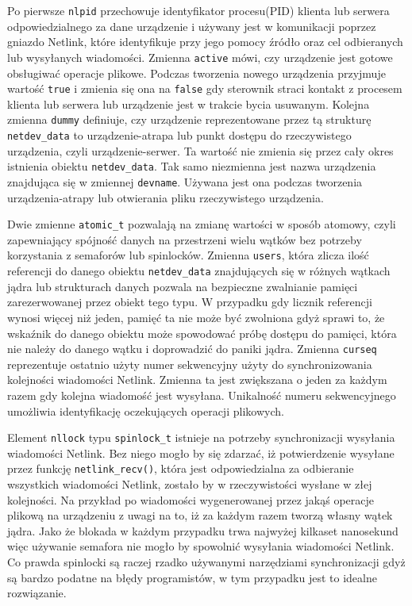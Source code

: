 \documentclass[11pt]{scrartcl}
\begin{document}
Po pierwsze \texttt{nlpid} przechowuje identyfikator procesu(PID) klienta lub serwera odpowiedzialnego za dane urządzenie i używany jest w komunikacji poprzez gniazdo Netlink, które identyfikuje przy jego pomocy źródło oraz cel odbieranych lub wysyłanych wiadomości. Zmienna \texttt{active} mówi, czy urządzenie jest gotowe obsługiwać operacje plikowe. Podczas tworzenia nowego urządzenia przyjmuje wartość \texttt{true} i zmienia się ona na \texttt{false} gdy sterownik straci kontakt z procesem klienta lub serwera lub urządzenie jest w trakcie bycia usuwanym.  Kolejna zmienna \texttt{dummy} definiuje, czy urządzenie reprezentowane przez tą strukturę \texttt{netdev\_data} to urządzenie-atrapa lub punkt dostępu do rzeczywistego urządzenia, czyli urządzenie-serwer. Ta wartość nie zmienia się przez cały okres istnienia obiektu \texttt{netdev\_data}. Tak samo niezmienna jest nazwa urządzenia znajdująca się w zmiennej \texttt{devname}. Używana jest ona podczas tworzenia urządzenia-atrapy lub otwierania pliku rzeczywistego urządzenia.

Dwie zmienne \texttt{atomic\_t} pozwalają na zmianę wartości w sposób atomowy, czyli zapewniający spójność danych na przestrzeni wielu wątków bez potrzeby korzystania z semaforów lub spinlocków. Zmienna \texttt{users}, która zlicza ilość referencji do danego obiektu \texttt{netdev\_data} znajdujących się w różnych wątkach jądra lub strukturach danych pozwala na bezpieczne zwalnianie pamięci zarezerwowanej przez obiekt tego typu. W przypadku gdy licznik referencji wynosi więcej niż jeden, pamięć ta nie może być zwolniona gdyż sprawi to, że wskaźnik do danego obiektu może spowodować próbę dostępu do pamięci, która nie należy do danego wątku i doprowadzić do paniki jądra. Zmienna \texttt{curseq} reprezentuje ostatnio użyty numer sekwencyjny użyty do synchronizowania kolejności wiadomości Netlink. Zmienna ta jest zwiększana o jeden za każdym razem gdy kolejna wiadomość jest wysyłana. Unikalność numeru sekwencyjnego umożliwia identyfikację oczekujących operacji plikowych.

Element \texttt{nllock} typu \texttt{spinlock\_t} istnieje na potrzeby synchronizacji wysyłania wiadomości Netlink. Bez niego mogło by się zdarzać, iż potwierdzenie wysyłane przez funkcję \texttt{netlink\_recv()}, która jest odpowiedzialna za odbieranie wszystkich wiadomości Netlink, zostało by w rzeczywistości wysłane w złej kolejności. Na przykład po wiadomości wygenerowanej przez jakąś operacje plikową na urządzeniu z uwagi na to, iż za każdym razem tworzą własny wątek jądra. Jako że blokada w każdym przypadku trwa najwyżej kilkaset nanosekund więc używanie semafora nie mogło by spowolnić wysyłania wiadomości Netlink. Co prawda spinlocki są raczej rzadko używanymi narzędziami synchronizacji gdyż są bardzo podatne na błędy programistów, w tym przypadku jest to idealne rozwiązanie.
\end{document}
